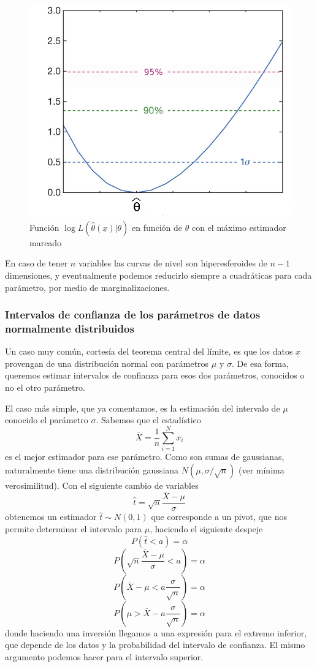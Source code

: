 \documentclass{article}
\numberwithin{equation}{section} %
\begin{document}
\begin{figure}[H]
\centering
\includegraphics[scale=0.45]{Lchi2}
\caption{Función $\log L(\hat{\theta}(\underline{x})|\theta)$ en función de $\theta$ con el máximo estimador marcado }
\label{fig:Lchi2}
\end{figure}

En caso de tener $n$ variables las curvas de nivel son hiperesferoides de $n-1$ dimensiones, y eventualmente podemos reducirlo siempre a cuadráticas para cada parámetro, por medio de marginalizaciones.

\subsubsection{Intervalos de confianza de los parámetros de datos normalmente distribuidos}
Un caso muy común, cortesía del teorema central del límite, es que los datos $\underline{x}$ provengan de una distribución normal con parámetros $\mu$ y $\sigma$. De esa forma, queremos estimar intervalos de confianza para esos dos parámetros, conocidos o no el otro parámetro.

El caso más simple, que ya comentamos, es la estimación del intervalo de $\mu$ conocido el parámetro $\sigma$. Sabemos que el estadístico 
\[ \overline{X} = \frac{1}{n} \sum_{i = 1}^{N} x_i \]
es el mejor estimador para ese parámetro. Como son sumas de gaussianas, naturalmente tiene una distribución gaussiana $N(\mu, \sigma / \sqrt{n})$ (ver mínima verosimilitud). Con el siguiente cambio de variables
\begin{equation}
\hat{t} = \sqrt{n} \frac{\overline{X} - \mu}{\sigma}
\end{equation}
obtenemos un estimador $\hat{t} \sim N(0,1)$ que corresponde a un pivot, que nos permite determinar el intervalo para $\mu$, haciendo el siguiente despeje
\[ P(\hat{t} < a) = \alpha\]
\[ P\left(\sqrt{n} \frac{\overline{X} - \mu}{\sigma} < a\right) = \alpha \]
\[ P\left(\overline{X} - \mu < a \frac{\sigma}{\sqrt{n}}\right) = \alpha \]
\[ P\left(\mu > \overline{X} - a \frac{\sigma}{\sqrt{n}}\right)  = \alpha \]
donde haciendo una inversión llegamos a una expresión para el extremo inferior, que depende de los datos y la probabilidad del intervalo de confianza. El mismo argumento podemos hacer para el intervalo superior.
\end{document}
